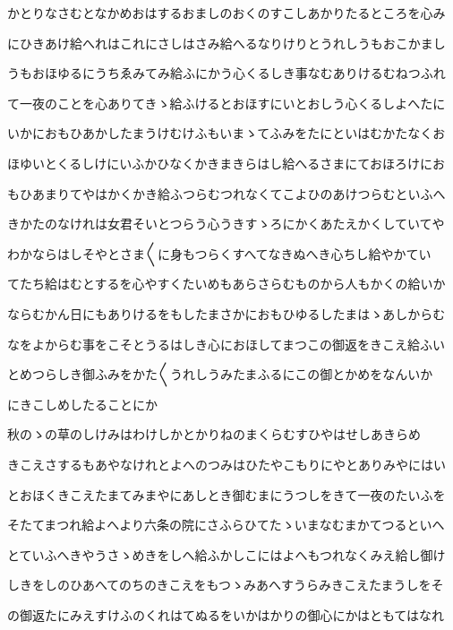 \documentclass[a4paper,11pt,landscape]{ltjtarticle}
\begin{document}
\par\medskip
かとりなさむとなかめおはするおましのおくのすこしあかりたるところを心み
\par\medskip
にひきあけ給へれはこれにさしはさみ給へるなりけりとうれしうもおこかまし
\par\medskip
うもおほゆるにうちゑみてみ給ふにかう心くるしき事なむありけるむねつふれ
\par\medskip
て一夜のことを心ありてきゝ給ふけるとおほすにいとおしう心くるしよへたに
\par\medskip
いかにおもひあかしたまうけむけふもいまゝてふみをたにといはむかたなくお
\par\medskip
ほゆいとくるしけにいふかひなくかきまきらはし給へるさまにておほろけにお
\par\medskip
もひあまりてやはかくかき給ふつらむつれなくてこよひのあけつらむといふへ
\par\medskip
きかたのなけれは女君そいとつらう心うきすゝろにかくあたえかくしていてや
\par\medskip
わかならはしそやとさま〱に身もつらくすへてなきぬへき心ちし給やかてい
\par\medskip
てたち給はむとするを心やすくたいめもあらさらむものから人もかくの給いか
\par\medskip
ならむかん日にもありけるをもしたまさかにおもひゆるしたまはゝあしからむ
\par\medskip
なをよからむ事をこそとうるはしき心におほしてまつこの御返をきこえ給ふい
\par\medskip
とめつらしき御ふみをかた〱うれしうみたまふるにこの御とかめをなんいか
\par\medskip
にきこしめしたることにか
\par\medskip
秋のゝの草のしけみはわけしかとかりねのまくらむすひやはせしあきらめ
\par\medskip
きこえさするもあやなけれとよへのつみはひたやこもりにやとありみやにはい
\par\medskip
とおほくきこえたまてみまやにあしとき御むまにうつしをきて一夜のたいふを
\par\medskip
そたてまつれ給よへより六条の院にさふらひてたゝいまなむまかてつるといへ
\par\medskip
とていふへきやうさゝめきをしへ給ふかしこにはよへもつれなくみえ給し御け
\par\medskip
しきをしのひあへてのちのきこえをもつゝみあへすうらみきこえたまうしをそ
\par\medskip
の御返たにみえすけふのくれはてぬるをいかはかりの御心にかはともてはなれ
\par\medskip
\end{document}
